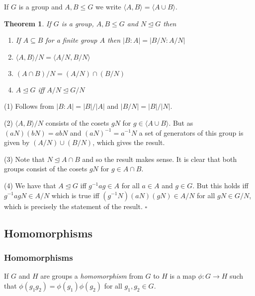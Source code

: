 \documentclass[10pt]{article}
\newtheorem{theorem}{Theorem}[section]
\newenvironment{proof}[1][Proof]{\begin{trivlist}
\item[\hskip \labelsep {\itshape #1}]}{\end{trivlist}}
\newenvironment{definition}[1][Definition]{\begin{trivlist}
\item[\hskip \labelsep {\bfseries #1}]}{\end{trivlist}}
\begin{document}
\begin{definition}
If $G$ is a group and $A, B \leq G$ we write $\langle A, B \rangle = \langle A\cup B \rangle$.
\end{definition}

\begin{theorem} \label{normalcontaining}
If $G$ is a group, $A, B \leq G$ and $N \mathrel{\unlhd} G$ then
\begin{enumerate}
\item If $A \subseteq B$ for a finite group $A$ then $|B:A| = |B/N:A/N|$
\item $\langle A, B \rangle/N = \langle A/N, B/N \rangle$
\item $(A\cap B)/N = (A/N)\cap (B/N)$
\item $A \mathrel{\unlhd} G$ iff $A/N \mathrel{\unlhd} G/N$
\end{enumerate}
\end{theorem}

\begin{proof}
(1) Follows from $|B:A| = |B|/|A|$ and $|B/N| = |B|/|N|$.

(2) $\langle A, B \rangle/N$ consists of the cosets $gN$ for $g \in \langle A\cup B \rangle$. But as $(aN)(bN) = abN$ and $(aN)^{-1} = a^{-1}N$ a set of generators of this group is given by $(A/N)\cup (B/N)$, which gives the result.

(3) Note that $N \mathrel{\unlhd} A\cap B$ and so the result makes sense. It is clear that both groups consist of the cosets $gN$ for $g \in A\cap B$.

(4) We have that $A \mathrel{\unlhd} G$ iff $g^{-1}ag \in A$ for all $a \in A$ and $g \in G$. But this holds iff $g^{-1}agN \in A/N$ which is true iff $(g^{-1}N)(aN)(gN) \in A/N$ for all $gN \in G/N$, which is precisely the statement of the result. $\square$
\end{proof}

\subsection{Homomorphisms}

\subsubsection{Homomorphisms}

\begin{definition}
If $G$ and $H$ are groups a \emph{homomorphism} from $G$ to $H$ is a map $\phi : G \to H$ such that $\phi(g_1g_2) = \phi(g_1)\phi(g_2)$ for all $g_1, g_2 \in G$.
\end{definition}
\end{document}
